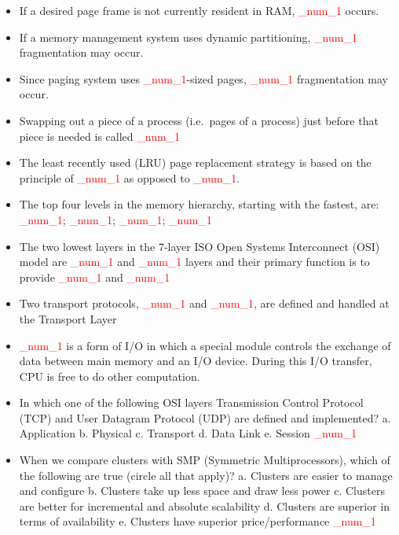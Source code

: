 \documentclass[9pt,landscape]{memoir}
\newcommand{\answer}[1]{\textcolor{red}{_num_1}}
\begin{document}
\raggedright\footnotesize
\begin{multicols}{6}

\setlength{\premulticols}{1pt}
\setlength{\postmulticols}{1pt}
\setlength{\multicolsep}{1pt}
\setlength{\columnsep}{2pt}
\tiny

\begin{itemize}
    \item If a desired page frame is not currently resident in RAM, \answer{A Page Fault} occurs.
    \item If a memory management system uses dynamic partitioning, \answer{External} fragmentation may occur.
    \item Since paging system uses \answer{fixed size}-sized pages, \answer{internal} fragmentation may occur.
    \item Swapping out a piece of a process (i.e.~pages of a process) just before that piece is needed is called \answer{Thrashing}
    \item The least recently used (LRU) page replacement strategy is based on the principle of \answer{temporal locality}  as opposed to \answer{spatial locality}.
    \item The top four levels in the memory hierarchy, starting with the fastest, are: \answer{Registers}; \answer{cache memory}; \answer{RAM}; \answer{Disk}
    \item The two lowest layers in the 7-layer ISO Open Systems Interconnect (OSI) model are \answer{Physical} and \answer{Data Link}  layers and their primary function is to provide \answer{signaling technology} and \answer{frame management}
    \item Two transport protocols, \answer{Transmission Control Protocol (TCP)} and \answer{User Datagram Protocol (UDP)}, are defined and handled at the Transport Layer
    \item \answer{DMA (Direct Memory Access)} is a form of I/O in which a special module controls the exchange of data between main memory and an I/O device. During this I/O transfer, CPU is free to do other computation.
    \item In which one of the following OSI layers Transmission Control Protocol (TCP) and User Datagram Protocol (UDP) are defined and implemented? a. Application b. Physical c. Transport d. Data Link e. Session \answer{c}
    \item When we compare clusters with SMP (Symmetric Multiprocessors), which of the following are true (circle all that apply)? a. Clusters are easier to manage and configure b. Clusters take up less space and draw less power c. Clusters are better for incremental and absolute scalability d. Clusters are superior in terms of availability e. Clusters have superior price/performance \answer{c, d, e}

\end{itemize}
\end{multicols}
\end{document}
